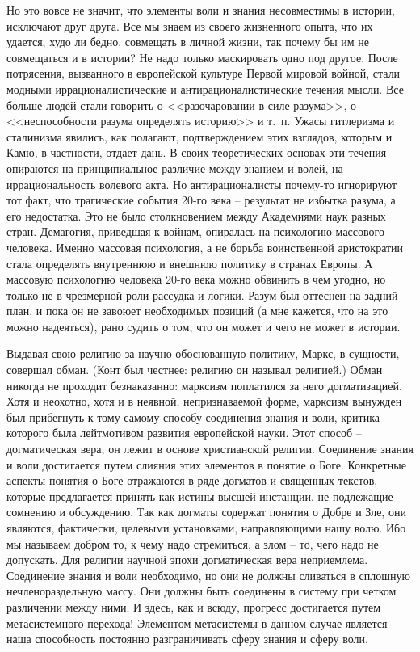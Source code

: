 \documentclass{book}
\begin{document}
Но это вовсе не значит, что элементы воли и знания несовместимы в истории, исключают друг друга. Все мы знаем из своего жизненного опыта, что их удается, худо ли бедно, сов­мещать в личной жизни, так почему бы им не совмещаться и в истории? Не надо только маскировать одно под другое. После потрясения, вызванного в европейской культуре Первой мировой войной, стали модными иррационалистические и антирационалистические течения мысли. Все больше людей стали говорить о <<разочаровании в силе разума>>, о <<неспособности разума определять историю>> и т.~п. Ужасы гитлеризма и сталинизма явились, как полагают, подтверждением этих взглядов, которым и Камю, в частности, отдает дань. В своих теоретических основах эти течения опираются на принципиальное различие между знанием и волей, на иррациональность волевого акта. Но антирационалисты почему-то игнорируют тот факт, что тра­гические события 20-го века -- результат не избытка разума, а его недостатка. Это не было столкновением между Академиями наук разных стран. 
Демагогия, 
приведшая к войнам, опиралась на психологию массового человека.  Именно массовая психология, а не борьба воинственной аристократии стала определять внутреннюю и внешнюю политику в странах Европы. А массовую психологию человека 20-го века можно обвинить в чем угодно, но только не в чрезмерной роли рассудка и логики. Разум был оттеснен на задний план, и пока он не завоюет необходимых позиций (а мне кажется, что на это можно надеяться), рано судить о том, что он может и чего не может в истории.

Выдавая свою религию за научно обоснованную политику, Маркс, в сущности, совершал обман. (Конт был честнее: религию он называл религией.) Обман никогда не проходит безнаказанно: марксизм поплатился за него догматизацией. Хотя и неохотно, хотя и в неявной, непризнаваемой форме, марксизм вынужден был прибегнуть к тому самому способу соединения знания и воли, критика которого была лейтмотивом развития европейской науки. Этот способ -- догматическая вера, он лежит в основе христианской религии. Соединение знания и воли достигается путем слияния этих элементов в понятие о Боге. Конкретные аспекты понятия о Боге отражаются в ряде догматов и священных текстов, которые предлагается принять как истины высшей инстанции, не подлежащие сомнению и обсуждению. Так как догматы содержат понятия о Добре и Зле, они являются, фактически, целевыми установками, направляющими нашу волю. Ибо мы называем добром то, к чему надо стре­миться, а злом -- то, чего надо не допускать.
Для религии научной эпохи догматическая вера неприемлема. Соединение знания и воли необходимо, но они не должны сливаться в сплошную нечленораздельную массу. Они должны быть соединены в систему при четком различении между ними. И здесь, как и всюду, прогресс достигается путем метасистемного перехода! Элементом метасистемы в данном случае является наша способность постоянно разграничивать сферу знания и сферу воли.
\end{document}
